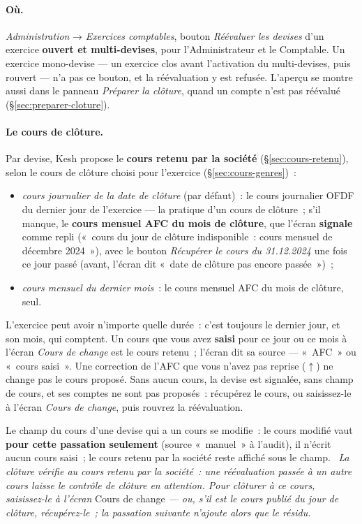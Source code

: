 \documentclass[a4paper,11pt,oneside]{article}
\begin{document}
\paragraph{Où.} \emph{Administration} → \emph{Exercices comptables}, bouton \emph{Réévaluer les devises} d'un exercice \textbf{ouvert et multi-devises}, pour l'Administrateur et le Comptable. Un exercice mono-devise --- un exercice clos avant l'activation du multi-devises, puis rouvert --- n'a pas ce bouton, et la réévaluation y est refusée. L'aperçu se montre aussi dans le panneau \emph{Préparer la clôture}, quand un compte n'est pas réévalué (\S\ref{sec:preparer-cloture}).

\paragraph{Le cours de clôture.} Par devise, Kesh propose le \textbf{cours retenu par la société} (\S\ref{sec:cours-retenu}), selon le cours de clôture choisi pour l'exercice (\S\ref{sec:cours-genres})~:
\begin{itemize}
    \item \emph{cours journalier de la date de clôture} (par défaut)~: le cours journalier OFDF du dernier jour de l'exercice --- la pratique d'un cours de clôture~; s'il manque, le \textbf{cours mensuel AFC du mois de clôture}, que l'écran \textbf{signale} comme repli («~cours du jour de clôture indisponible~: cours mensuel de décembre 2024~»), avec le bouton \emph{Récupérer le cours du 31.12.2024} une fois ce jour passé (avant, l'écran dit «~date de clôture pas encore passée~»)~;
    \item \emph{cours mensuel du dernier mois}~: le cours mensuel AFC du mois de clôture, seul.
\end{itemize}
L'exercice peut avoir n'importe quelle durée~: c'est toujours le dernier jour, et son mois, qui comptent. Un cours que vous avez \textbf{saisi} pour ce jour ou ce mois à l'écran \emph{Cours de change} est le cours retenu~; l'écran dit sa source --- «~AFC~» ou «~cours saisi~». Une correction de l'AFC que vous n'avez pas reprise ($\uparrow$) ne change pas le cours proposé. Sans aucun cours, la devise est signalée, sans champ de cours, et ses comptes ne sont pas proposés~: récupérez le cours, ou saisissez-le à l'écran \emph{Cours de change}, puis rouvrez la réévaluation.

Le champ du cours d'une devise qui a un cours se modifie~: le cours modifié vaut \textbf{pour cette passation seulement} (source «~manuel~» à l'audit), il n'écrit aucun cours saisi~; le cours retenu par la société reste affiché sous le champ. \keshAttention\ \emph{La clôture vérifie au cours retenu par la société~: une réévaluation passée à un autre cours laisse le contrôle de clôture en attention. Pour clôturer à ce cours, saisissez-le à l'écran} Cours de change \emph{--- ou, s'il est le cours publié du jour de clôture, récupérez-le~; la passation suivante n'ajoute alors que le résidu.}
\end{document}
